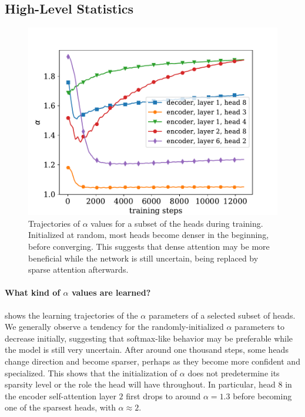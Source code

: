 \subsection{High-Level Statistics}
\label{sec:stats}

\begin{figure}[ht]
    \centering
    \includegraphics[width=0.85\columnwidth]{Figures/learning_alpha.pdf}
    \caption{\label{fig:learning_alpha}
        Trajectories of $\alpha$ values for a subset of the heads during
        training. Initialized at random, most heads become denser in the
        beginning, before converging. This suggests that dense attention may
        be more beneficial while the network is still uncertain, being
        replaced by sparse attention afterwards.}
\end{figure}

\paragraph*{What kind of {\boldmath $\alpha$} values are learned?}
 shows the learning trajectories of the
$\alpha$ parameters of a selected subset of heads. We generally
observe a tendency for the randomly-initialized $\alpha$ parameters
to decrease initially, suggesting that softmax-like behavior may be
preferable while the model is still very uncertain. After around one
thousand steps, some heads change direction and become sparser,
perhaps as they become more confident and specialized. This shows
that the initialization of $\alpha$ does not predetermine its
sparsity level or the role the head will have throughout. In
particular, head $8$ in the encoder self-attention layer $2$ first
drops to around $\alpha=1.3$ before becoming one of the sparsest
heads, with $\alpha\approx2$.


